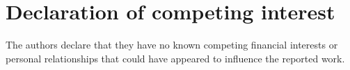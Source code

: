 \section*{Declaration of competing interest}
\label{sec:competing_interest}
The authors declare that they have no known competing financial interests or personal relationships that could have appeared to influence the reported work.
